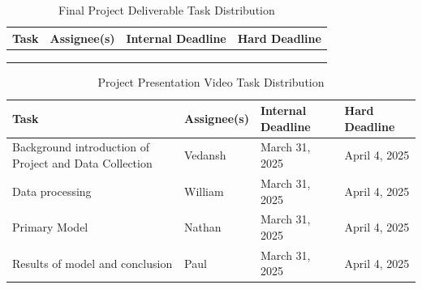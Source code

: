 \documentclass{article} %
\begin{document}
\begin{table}[t]
    \caption{Final Project Deliverable Task Distribution}
    \label{Final_Project_Deliverable_Task_Distribution}
    \begin{center}
    \begin{tabularx}{\textwidth}{|>{\raggedright\arraybackslash}X|>{\raggedright\arraybackslash}X|>{\raggedright\arraybackslash}X|>{\raggedright\arraybackslash}X|}
    \hline
    \textbf{Task} & \textbf{Assignee(s)} & \textbf{Internal Deadline} & \textbf{Hard Deadline} \\
    \hline
     &  &  &  \\
    \hline
     &  &  &  \\
    \hline
     &  &  &  \\
    \hline
    \end{tabularx}
    \end{center}
    \end{table}

\begin{table}[t]
    \caption{Project Presentation Video Task Distribution}
    \label{Project_Presentation_Video_Task_Distribution}
    \begin{center}
    \begin{tabularx}{\textwidth}{|>{\raggedright\arraybackslash}X|>{\raggedright\arraybackslash}X|>{\raggedright\arraybackslash}X|>{\raggedright\arraybackslash}X|}
    \hline
    \textbf{Task} & \textbf{Assignee(s)} & \textbf{Internal Deadline} & \textbf{Hard Deadline} \\
    \hline
    Background introduction of Project and Data Collection & Vedansh & March 31, 2025 & April 4, 2025 \\
    \hline
    Data processing & William & March 31, 2025 & April 4, 2025 \\
    \hline
    Primary Model & Nathan & March 31, 2025 & April 4, 2025 \\
    \hline
    Results of model and conclusion & Paul & March 31, 2025 & April 4, 2025 \\
    \hline
    \end{tabularx}
    \end{center}
    \end{table}
\end{document}
